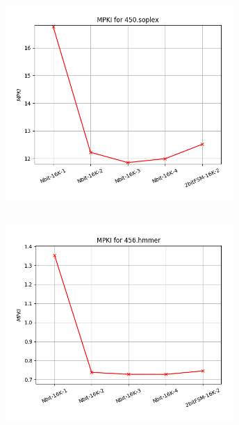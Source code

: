   \begin{minipage}{\textwidth}
      \begin{center}
         \\
         \vspace{3mm}
         \includegraphics[width=0.65\textwidth, frame]{./graphs/4-2i/450-soplex.png}
         \vspace{6mm}
      \end{center}
   \end{minipage}

   \begin{minipage}{\textwidth}
      \begin{center}
         \\
         \vspace{3mm}
         \includegraphics[width=0.65\textwidth, frame]{./graphs/4-2i/456-hmmer.png}
         \vspace{6mm}
      \end{center}
   \end{minipage}

